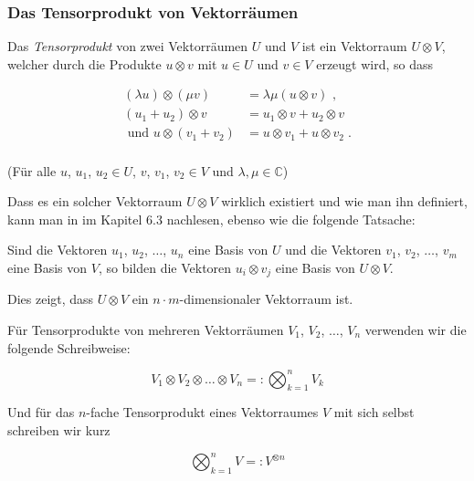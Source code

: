 \subsubsection{Das Tensorprodukt von Vektorräumen}

Das \textit{Tensorprodukt} von zwei Vektorräumen $U$ und $V$ ist ein Vektorraum $U\!\otimes\! V$, welcher durch die Produkte $u\otimes v$ mit $u\in U$ und $v\in V$ erzeugt wird, so dass 

\vspace{-0.5cm}
\[\begin{split} 
(\lambda u)\otimes (\mu v) &=\lambda \mu (u\otimes v)\text{ , }  \\[0.2cm]
(u_1+u_2)\otimes v &= u_1\otimes v + u_2\otimes v \\[0.2cm]
\text{ und }  u\otimes (v_1+v_2)&=u\otimes v_1 + u\otimes v_2 \; .\\
\end{split}\]

\vspace{-0.2cm}
\noindent (Für alle $u$, $u_1$, $u_2\in U$, $v$, $v_1$, $v_2\in V$ und $\lambda, \mu \in \mathbb{C}$)

\vspace{0.2cm}
\noindent Dass es ein solcher Vektorraum $U\otimes V$ wirklich existiert und wie man ihn definiert, kann man in \cite{LA} im Kapitel 6.3 nachlesen, ebenso wie die folgende Tatsache:

\vspace{0.2cm}
\noindent Sind die Vektoren $u_1$, $u_2$, $\ldots$, $u_n$ eine Basis von $U$ und die Vektoren $v_1$, $v_2$, $\ldots$, $v_m$ eine Basis von $V$, so bilden die Vektoren $u_i \otimes v_j$ eine Basis von $U\otimes V$. 
\vspace{0.1cm}

\noindent Dies zeigt, dass $U\otimes V$ ein $n\cdot m$-dimensionaler Vektorraum ist.

\vspace{0.3cm}
\noindent Für Tensorprodukte von mehreren Vektorräumen $V_1$, $V_2$, $\ldots$, $V_n$ verwenden wir die folgende Schreibweise:

\vspace{-0.7cm}
\[V_1\otimes V_2\otimes \ldots \otimes V_n=:\bigotimes_{k=1}^nV_k\]


\noindent Und für das $n$-fache Tensorprodukt eines Vektorraumes $V$ mit sich selbst schreiben wir kurz 

\vspace{-0.3cm}
\[\bigotimes_{k=1}^nV=:V^{\otimes n}\]

